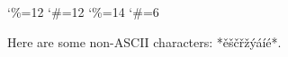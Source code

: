 \documentclass{book}
\begin{document}

\catcode`\%=12\relax
\catcode`\#=12\relax
{}
\catcode`\%=14\relax
\catcode`\#=6\relax

\begin{markdown}
Here are some non-ASCII characters: *ěščřžýáíé*.
\end{markdown}
\end{document}
